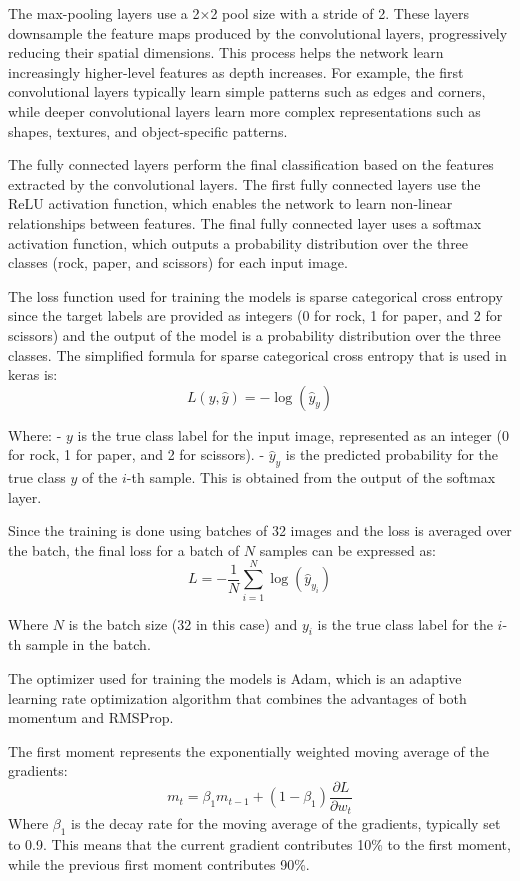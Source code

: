 \documentclass[runningheads]{llncs}
\begin{document}
The max-pooling layers use a 2×2 pool size with a stride of 2. These layers downsample the feature maps produced by the convolutional layers, progressively reducing their spatial dimensions. This process helps the network learn increasingly higher-level features as depth increases. For example, the first convolutional layers typically learn simple patterns such as edges and corners, while deeper convolutional layers learn more complex representations such as shapes, textures, and object-specific patterns.

The fully connected layers perform the final classification based on the features extracted by the convolutional layers. The first fully connected layers use the ReLU activation function, which enables the network to learn non-linear relationships between features. The final fully connected layer uses a softmax activation function, which outputs a probability distribution over the three classes (rock, paper, and scissors) for each input image.


The loss function used for training the models is sparse categorical cross entropy since the target labels are provided as integers (0 for rock, 1 for paper, and 2 for scissors) and the output of the model is a probability distribution over the three classes. The simplified formula for sparse categorical cross entropy that is used in keras is:
$$L(y,\hat{y}) = -\log(\hat{y}_{y})$$

Where:
- $y$ is the true class label for the input image, represented as an integer (0 for rock, 1 for paper, and 2 for scissors).
- $\hat{y}_{y}$ is the predicted probability for the true class $y$ of the $i$-th sample. This is obtained from the output of the softmax layer.

Since the training is done using batches of 32 images and the loss is averaged over the batch, the final loss for a batch of $N$ samples can be expressed as:
$$L = -\frac{1}{N} \sum_{i=1}^{N} \log(\hat{y}_{y_i})$$

Where $N$ is the batch size (32 in this case) and $y_i$ is the true class label for the $i$-th sample in the batch.

The optimizer used for training the models is Adam, which is an adaptive learning rate optimization algorithm that combines the advantages of both momentum and RMSProp. 

The first moment represents the exponentially weighted moving average of the gradients:
\[
m_t = \beta_1 m_{t-1} + (1 - \beta_1)\frac{\partial L}{\partial w_t}
\]
Where $\beta_1$ is the decay rate for the moving average of the gradients, typically set to 0.9. This means that the current gradient contributes 10\% to the first moment, while the previous first moment contributes 90\%. 
\end{document}
